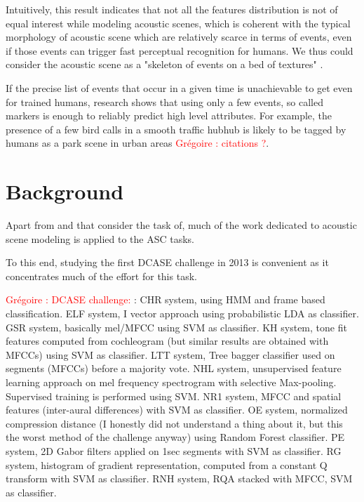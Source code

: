 \documentclass[journal]{IEEEtran}
\newcommand{\gl}[1]{\textcolor{red}{Gr\'egoire : #1}}
\begin{document}
Intuitively, this result indicates that not all the features distribution is not of equal interest while modeling acoustic scenes, which is coherent with the typical morphology of acoustic scene which are relatively scarce in terms of events, even if those events can trigger fast perceptual recognition for humans. We thus could consider the acoustic scene as a "skeleton of events on a bed of textures" \cite{nelken_ear_2013}.

If the precise list of events that occur in a given time is unachievable to get even for trained humans, research shows that using only a few events, so called markers \cite{} is enough to reliably predict high level attributes. For example, the presence of a few bird calls in a smooth traffic hubhub is likely to be tagged by humans as a park scene in urban areas \gl{citations ?}.

\section{Background} \label{sec:soa}

Apart from \cite{aucouturier2007bag} and \cite{lagrange:hal-01082501} that consider the task of, much of the work dedicated to acoustic scene modeling is applied to the ASC tasks.

To this end, studying the first DCASE challenge \cite{barchiesi2015acoustic} in 2013 is convenient as it concentrates much of the effort for this task.

\gl{DCASE challenge:} \cite{chum2013ieee}: CHR system, using HMM and frame based classification. \cite{elizalde2013vector} ELF system, I vector approach using probabilistic LDA as classifier. \cite{geiger2013large} GSR system, basically mel/MFCC using SVM as classifier. \cite{krijnders2013tone} KH system, tone fit features computed from cochleogram (but similar results are obtained with MFCCs) using SVM as classifier. \cite{li2013auditory} LTT system, Tree bagger classifier used on segments (MFCCs) before a majority vote. \cite{lee2013acoustic} NHL system, unsupervised feature learning approach on mel frequency spectrogram with selective Max-pooling. Supervised training is performed using SVM. \cite{nogueira2013sound} NR1 system, MFCC and spatial features (inter-aural differences) with SVM as classifier. \cite{olivetti2013wonder} OE system, normalized compression distance (I honestly did not understand a thing about it, but this the worst method of the challenge anyway) using  Random Forest  classifier.  \cite{patil2013multiresolution} PE system, 2D Gabor filters applied on 1sec segments with SVM as classifier.  \cite{rakotomamonjy2015histogram} RG system, histogram of gradient representation, computed from a constant Q transform with SVM as classifier.  \cite{roma2013recurrence} RNH system, RQA stacked with MFCC, SVM as classifier. \\
\end{document}
